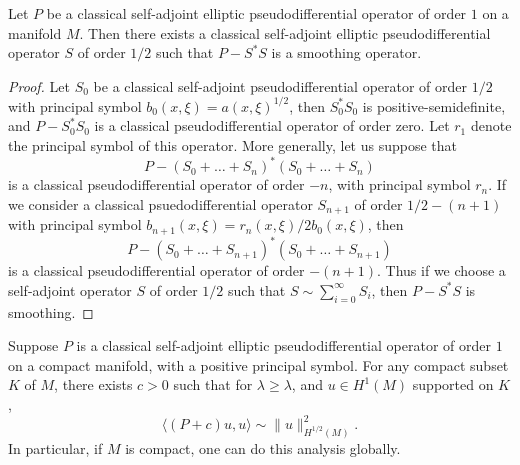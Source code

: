 \begin{lemma}
    Let $P$ be a classical self-adjoint elliptic pseudodifferential operator of order $1$ on a manifold $M$. Then there exists a classical self-adjoint elliptic pseudodifferential operator $S$ of order $1/2$ such that $P - S^* S$ is a smoothing operator.
\end{lemma}
\begin{proof}
    Let $S_0$ be a classical self-adjoint pseudodifferential operator of order $1/2$ with principal symbol $b_0(x,\xi) = a(x,\xi)^{1/2}$, then $S_0^* S_0$ is positive-semidefinite, and $P - S_0^* S_0$ is a classical pseudodifferential operator of order zero. Let $r_1$ denote the principal symbol of this operator. More generally, let us suppose that
    \[ P - (S_0 + \dots + S_n)^* (S_0 + \dots + S_n) \]
    is a classical pseudodifferential operator of order $-n$, with principal symbol $r_n$. If we consider a classical psuedodifferential operator $S_{n+1}$ of order $1/2 - (n+1)$ with principal symbol $b_{n+1}(x,\xi) = r_n(x,\xi) / 2 b_0(x,\xi)$, then
    \[ P - (S_0 + \dots + S_{n+1})^* (S_0 + \dots + S_{n+1}) \]
    is a classical pseudodifferential operator of order $-(n+1)$. Thus if we choose a self-adjoint operator $S$ of order $1/2$ such that $S \sim \sum_{i = 0}^\infty S_i$, then $P - S^* S$ is smoothing. 
\end{proof}

\begin{lemma}
    Suppose $P$ is a classical self-adjoint elliptic pseudodifferential operator of order $1$ on a compact manifold, with a positive principal symbol. For any compact subset $K$ of $M$, there exists $c > 0$ such that for $\lambda \geq \lambda$, and $u \in H^1(M)$ supported on $K$,
    \[ \langle (P + c) u, u \rangle \sim \| u \|_{H^{1/2}(M)}^2. \]
    In particular, if $M$ is compact, one can do this analysis globally.
\end{lemma}


